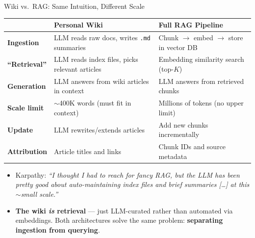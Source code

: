 \documentclass[10pt,english,aspectratio=169]{beamer}
\begin{document}
\begin{frame}{Wiki vs.\ RAG: Same Intuition, Different Scale}
\begin{center}
\renewcommand{\arraystretch}{1.3}
\begin{tabular}{|p{3.0cm}|p{4.5cm}|p{5.5cm}|}
\hline
& \textbf{Personal Wiki} & \textbf{Full RAG Pipeline} \\
\hline
\textbf{Ingestion} & LLM reads raw docs, writes \texttt{.md} summaries & Chunk $\to$ embed $\to$ store in vector DB \\
\hline
\textbf{``Retrieval''} & LLM reads index files, picks relevant articles & Embedding similarity search (top-$K$) \\
\hline
\textbf{Generation} & LLM answers from wiki articles in context & LLM answers from retrieved chunks \\
\hline
\textbf{Scale limit} & ${\sim}$400K words (must fit in context) & Millions of tokens (no upper limit) \\
\hline
\textbf{Update} & LLM rewrites/extends articles & Add new chunks incrementally \\
\hline
\textbf{Attribution} & Article titles and links & Chunk IDs and source metadata \\
\hline
\end{tabular}
\end{center}

\medskip
\begin{itemize}
\item Karpathy: \emph{``I thought I had to reach for fancy RAG, but the LLM has been pretty good about auto-maintaining index files and brief summaries \textnormal{[\ldots]} at this $\sim$small scale.''}

\medskip
\item \textbf{The wiki \emph{is} retrieval} --- just LLM-curated rather than automated via embeddings. Both architectures solve the same problem: \textbf{separating ingestion from querying}.
\end{itemize}
\end{frame}
\end{document}
